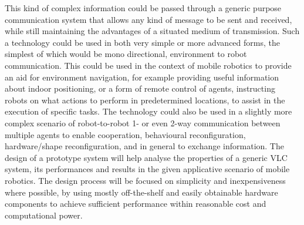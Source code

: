 This kind of complex information could be passed through a generic purpose communication system that allows any kind of message to be sent and received, while still maintaining the advantages of a situated medium of transmission.
Such a technology could be used in both very simple or more advanced forms, the simplest of which would be mono directional, environment to robot communication.
This could be used in the context of mobile robotics to provide an aid for environment navigation, for example providing useful information about indoor positioning,
or a form of remote control of agents, instructing robots on what actions to perform in predetermined locations, to assist in the execution of specific tasks. 
The technology could also be used in a slightly more complex scenario of robot-to-robot 1- or even 2-way communication between multiple agents to enable cooperation, behavioural reconfiguration, hardware/shape reconfiguration, and in general to exchange information.
\newline
The design of a prototype system will help analyse the properties of a generic VLC system, its performances and results in the given applicative scenario of mobile robotics.
The design process will be focused on simplicity and inexpensiveness where possible, by using mostly off-the-shelf and easily obtainable hardware components to achieve sufficient performance within reasonable cost and computational power.

